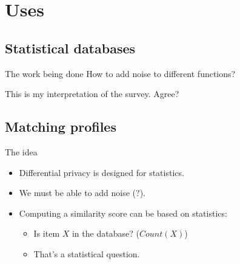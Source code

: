 \section{Uses}

\subsection{Statistical databases}

\begin{frame}
  \begin{block}{The work being done}
    How to add noise to different functions?
  \end{block}

  \pause{}

  \begin{question}
    This is my interpretation of the survey.
    Agree?
  \end{question}
\end{frame}

\subsection{Matching profiles}

\begin{frame}
  \begin{block}{The idea}
    \begin{itemize}
      \item Differential privacy is designed for statistics.
      \item {\color{red} We must be able to add noise (?).}

        \pause{}

      \item Computing a similarity score can be based on statistics:
        \begin{itemize}
          \item Is item \(X\) in the database? (\(Count(X)\))
          \item That's a statistical question.
        \end{itemize}
    \end{itemize}
  \end{block}
\end{frame}

